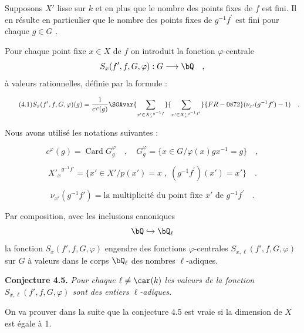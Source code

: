 Supposons $X'$ lisse sur $k$ et en plus que le nombre des points fixes de $f$ est fini. Il en résulte en particulier que le nombre des points fixes de $g^{-1}f^{\prime}$ est fini pour chaque $g \in G$ .

Pour chaque point fixe $x \in X$ de $f$ on introduit la fonction $\varphi$-centrale
\[
S_x(f',f,G,\varphi) : G \longrightarrow \bQ \quad ,
\]
à valeurs rationnelles, définie par la formule :

\begin{equation}\tag{4.1}
S_x(f',f,G,\varphi)(g) = \frac{1}{c^\varphi(g)} \SGAvar{\sum_{x' \in {X'_x}^{g^{-1}f}}}{\sum_{x' \in {X'_x}^{g^{-1}f'}}}{FR-0872} (\nu_{x'}(g^{-1}f') - 1) \quad .
\end{equation}

Nous avons utilisé les notations suivantes :

\begin{equation}\tag{4.2}
c^\varphi(g) = \operatorname{Card} G_g^\varphi \quad , \quad G_g^\varphi = \{ x \in G / \varphi(x)gx^{-1} = g \} \quad ,
\end{equation}

\begin{equation}\tag{4.3}
{X'_x}^{g^{-1}f'} = \{ x' \in X' / p(x') = x \; , \; (g^{-1}f^{\prime})(x') = x' \} \quad .
\end{equation}

\begin{equation}\tag{4.4}
\nu_{x'}(g^{-1}f') = \text{la multiplicité du point fixe } x' \text{ de } g^{-1}f^{\prime} \quad .
\end{equation}

Par composition, avec les inclusions canoniques
\[
\bQ \hookrightarrow \bQ_\ell
\]
la
fonction $S_x(f',f,G,\varphi)$ engendre des fonctions $\varphi$-centrales $S_{x,\ell}(f',f,G,\varphi)$ sur $G$ à valeurs dans le corps $\bQ_\ell$ des nombres $\ell$-adiques.

\medskip
\noindent
\textbf{Conjecture 4.5.} \emph{Pour chaque $\ell \neq \car(k)$ les valeurs de la fonction $S_{x,\ell}(f',f,G,\varphi)$ sont des entiers $\ell$-adiques.}

\medskip

On va prouver dans la suite que la conjecture 4.5 est vraie si la dimension de $X$ est égale à 1.

